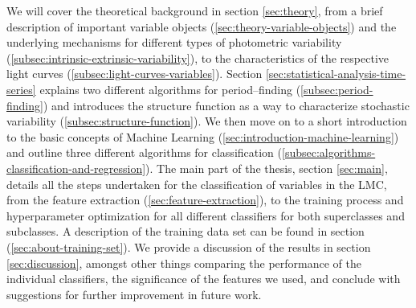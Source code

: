 


We will cover the theoretical background in section \ref{sec:theory}, from a brief description of important variable objects (\ref{sec:theory-variable-objects}) and the underlying mechanisms for different types of photometric variability (\ref{subsec:intrinsic-extrinsic-variability}), to the characteristics of the respective light curves (\ref{subsec:light-curves-variables}). Section \ref{sec:statistical-analysis-time-series} explains two different algorithms for period--finding (\ref{subsec:period-finding}) and introduces the structure function as a way to characterize stochastic variability (\ref{subsec:structure-function}). We then move on to a short introduction to the basic concepts of Machine Learning (\ref{sec:introduction-machine-learning}) and outline three different algorithms for classification (\ref{subsec:algorithms-classification-and-regression}). The main part of the thesis, section \ref{sec:main}, details all the steps undertaken for the classification of variables in the LMC, from the feature extraction (\ref{sec:feature-extraction}), to the training process and hyperparameter optimization for all different classifiers for both superclasses and subclasses. A description of the training data set can be found in section (\ref{sec:about-training-set}). We provide a discussion of the results in section \ref{sec:discussion}, amongst other things comparing the performance of the individual classifiers, the significance of the features we used, and conclude with suggestions for further improvement in future work.
